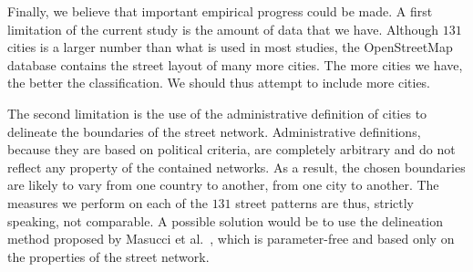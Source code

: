 Finally, we believe that important empirical progress could be made. A first
limitation of the current study is the amount of data that we have. Although
$131$ cities is a larger number than what is used in most studies, the
OpenStreetMap database contains the street layout of many more cities. The more
cities we have, the better the classification. We should thus attempt to include
more cities.

The second limitation is the use of the administrative definition of cities to
delineate the boundaries of the street network. Administrative definitions,
because they are based on political criteria, are completely arbitrary and do
not reflect any property of the contained networks. As a result, the chosen
boundaries are likely to vary from one country to another, from one city to
another. The measures we perform on each of the $131$ street patterns are thus, strictly
speaking, not comparable. A possible solution would be to use the delineation
method proposed by Masucci et al.~\cite{Masucci:2015}, which is parameter-free
and based only on the properties of the street network.
